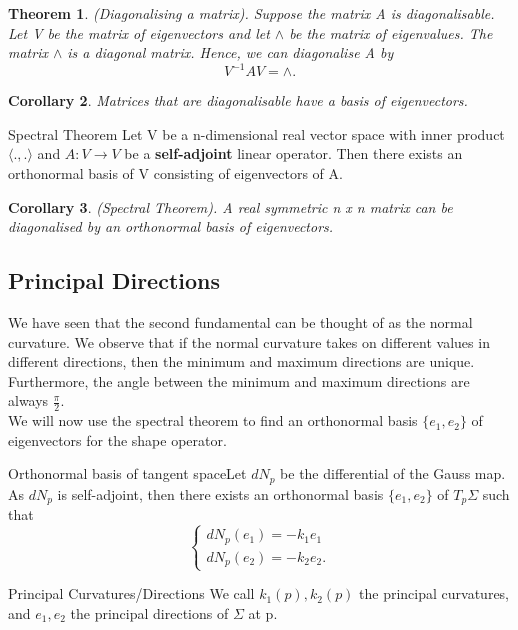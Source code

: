 \documentclass[twoside]{article}
\newcounter{lecnum}
\newtheorem{theorem}{Theorem}[lecnum]
\newtheorem{corollary}[theorem]{Corollary}
\begin{document}
\begin{theorem}(Diagonalising a matrix). Suppose the matrix A is diagonalisable. Let V be the matrix of eigenvectors and let $\wedge$ be the matrix of eigenvalues. The matrix $\wedge$ is a diagonal matrix. Hence, we can diagonalise A by 
$$
V^{-1}AV = \wedge.
$$
\end{theorem}

\begin{corollary}Matrices that are diagonalisable have a basis of eigenvectors. 
\end{corollary}

\begin{theorem_exam}{Spectral Theorem}{} Let V be a n-dimensional real vector space with inner product $\langle .,.\rangle$ and $A: V \rightarrow V$ be a \textbf{self-adjoint} linear operator. Then there exists an orthonormal basis of V consisting of eigenvectors of A.
\end{theorem_exam}

\begin{corollary}(Spectral Theorem). A real symmetric n x n matrix can be diagonalised by an orthonormal basis of eigenvectors.
\end{corollary}

\subsection{Principal Directions}
We have seen that the second fundamental can be thought of as the normal curvature. We observe that if the normal curvature takes on different values in different directions, then the minimum and maximum directions are unique. Furthermore, the angle between the minimum and maximum directions are always $\frac{\pi}{2}.$\\
We will now use the spectral theorem to find an orthonormal basis $\{e_1,e_2\}$ of eigenvectors for the shape operator.
\begin{theorem_exam}{Orthonormal basis of tangent space}{}Let $dN_p$ be the differential of the Gauss map. As $dN_p$ is self-adjoint, then there exists an orthonormal basis $\{e_1,e_2\}$ of $T_p\Sigma$ such that 
$$
\begin{cases}
dN_p(e_1) = -k_1e_1\\
dN_p(e_2) = -k_2e_2.
\end{cases}
$$
\end{theorem_exam}

\begin{definition_exam}{Principal Curvatures/Directions}{} We call $k_1(p), k_2(p)$ the principal curvatures, and $e_1,e_2$ the principal directions of $\Sigma$ at p.
\end{definition_exam}
\end{document}

